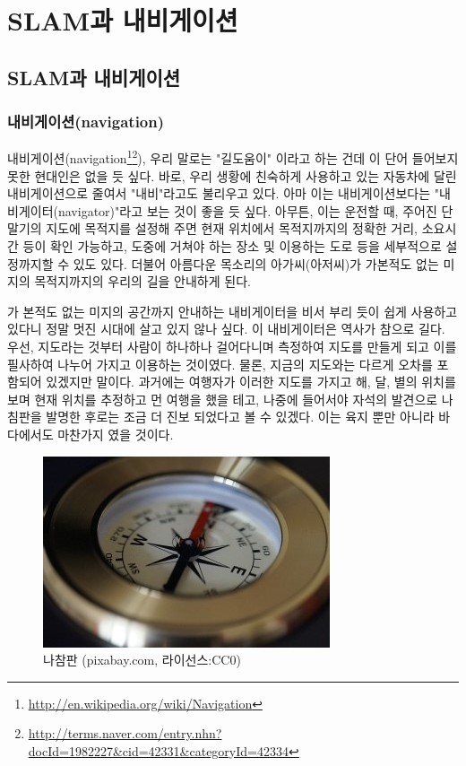 
\chapter{SLAM과 내비게이션}

\section{SLAM과 내비게이션}

\subsection{내비게이션(navigation)}

내비게이션(navigation\footnote{\url{http://en.wikipedia.org/wiki/Navigation}}\footnote{\url{http://terms.naver.com/entry.nhn?docId=1982227\&cid=42331\&categoryId=42334}}), 우리 말로는 "길도움이" 이라고 하는 건데 이 단어 들어보지 못한 현대인은 없을 듯 싶다. 바로, 우리 생황에 친숙하게 사용하고 있는 자동차에 달린 내비게이션으로 줄여서 "내비"라고도 불리우고 있다. 아마 이는 내비게이션보다는 "내비게이터(navigator)"라고 보는 것이 좋을 듯 싶다. 아무튼, 이는 운전할 때, 주어진 단말기의 지도에 목적지를 설정해 주면 현재 위치에서 목적지까지의 정확한 거리, 소요시간 등이 확인 가능하고, 도중에 거쳐야 하는 장소 및 이용하는 도로 등을 세부적으로 설정까지할 수 있도 있다. 더불어 아름다운 목소리의 아가씨(아저씨)가 가본적도 없는 미지의 목적지까지의 우리의 길을 안내하게 된다. 

가 본적도 없는 미지의 공간까지 안내하는 내비게이터을 비서 부리 듯이 쉽게 사용하고 있다니 정말 멋진 시대에 살고 있지 않나 싶다. 이 내비게이터은 역사가 참으로 길다. 우선, 지도라는 것부터 사람이 하나하나 걸어다니며 측정하여 지도를 만들게 되고 이를 필사하여 나누어 가지고 이용하는 것이였다. 물론, 지금의 지도와는 다르게 오차를 포함되어 있겠지만 말이다. 과거에는 여행자가 이러한 지도를 가지고 해, 달, 별의 위치를 보며 현재 위치를 추정하고 먼 여행을 했을 테고, 나중에 들어서야 자석의 발견으로 나침판을 발명한 후로는 조금 더 진보 되었다고 볼 수 있겠다. 이는 육지 뿐만 아니라 바다에서도 마찬가지 였을 것이다.

\begin{figure}[h]
\centering\includegraphics[width=0.5\columnwidth]{pictures/chapter11/compass.jpg}
\caption{나참판 (pixabay.com, 라이선스:CC0)}
\end{figure}

